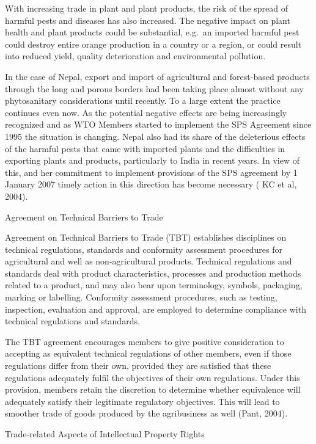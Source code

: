 \documentclass[]{book}
\begin{document}
With increasing trade in plant and plant products, the risk of the spread of harmful pests and diseases has also increased. The negative impact on plant health and plant products could be substantial, e.g.~an imported harmful pest could destroy entire orange production in a country or a region, or could result into reduced yield, quality deterioration and environmental pollution.

In the case of Nepal, export and import of agricultural and forest-based products through the long and porous borders had been taking place almost without any phytosanitary considerations until recently. To a large extent the practice continues even now. As the potential negative effects are being increasingly recognized and as WTO Members started to implement the SPS Agreement since 1995 the situation is changing. Nepal also had its share of the deleterious effects of the harmful pests that came with imported plants and the difficulties in exporting plants and products, particularly to India in recent years. In view of this, and her commitment to implement provisions of the SPS agreement by 1 January 2007 timely action in this direction has become necessary ( KC et al, 2004).

Agreement on Technical Barriers to Trade

Agreement on Technical Barriers to Trade (TBT) establishes disciplines on technical regulations, standards and conformity assessment procedures for agricultural and well as non-agricultural products. Technical regulations and standards deal with product characteristics, processes and production methods related to a product, and may also bear upon terminology, symbols, packaging, marking or labelling. Conformity assessment procedures, such as testing, inspection, evaluation and approval, are employed to determine compliance with technical regulations and standards.

The TBT agreement encourages members to give positive consideration to accepting as equivalent technical regulations of other members, even if those regulations differ from their own, provided they are satisfied that these regulations adequately fulfil the objectives of their own regulations. Under this provision, members retain the discretion to determine whether equivalence will adequately satisfy their legitimate regulatory objectives. This will lead to smoother trade of goods produced by the agribusiness as well (Pant, 2004).

Trade-related Aspects of Intellectual Property Rights
\end{document}
